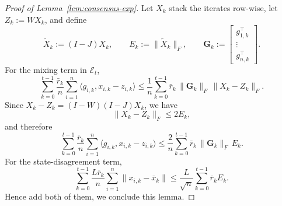 \documentclass[10pt,a4paper]{amsart}
\begin{document}
\begin{proof}[Proof of Lemma~\ref{lem:consensus-exp}]
Let \(X_k\) stack the iterates row-wise, let \(Z_k:=WX_k\), and define
\[
\widetilde X_k:=(I-J)X_k,
\qquad
E_k:=\|\widetilde X_k\|_F,
\qquad
\mathbf G_k:=\begin{bmatrix} g_{1,k}^\top \\ \vdots \\ g_{n,k}^\top \end{bmatrix}.
\]
For the mixing term in \(\mathcal E_t\),
\[
\sum_{k=0}^{t-1}\frac{\bar r_k}{n}\sum_{i=1}^n
\langle g_{i,k},x_{i,k}-z_{i,k}\rangle
\le
\frac{1}{n}\sum_{k=0}^{t-1}\bar r_k\,\|\mathbf G_k\|_F\,\|X_k-Z_k\|_F.
\]
Since \(X_k-Z_k=(I-W)(I-J)X_k\), we have
\[
\|X_k-Z_k\|_F\le 2E_k,
\]
and therefore
\[
\sum_{k=0}^{t-1}\frac{\bar r_k}{n}\sum_{i=1}^n
\langle g_{i,k},x_{i,k}-z_{i,k}\rangle
\le
\frac{2}{n}\sum_{k=0}^{t-1}\bar r_k\,\|\mathbf G_k\|_F\,E_k.
\]
For the state-disagreement term,
\[
\sum_{k=0}^{t-1}\frac{L\bar r_k}{n}\sum_{i=1}^n \|x_{i,k}-\bar x_k\|
\le
\frac{L}{\sqrt n}\sum_{k=0}^{t-1}\bar r_k E_k.
\]
Hence add both of them, we conclude this lemma.
\end{proof}
\end{document}
